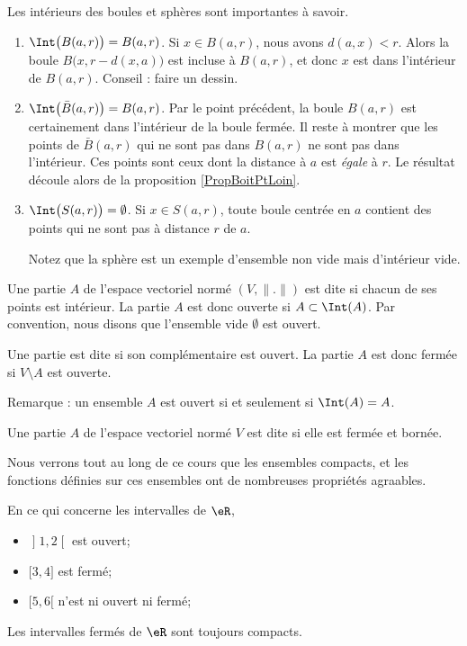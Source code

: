 \begin{example}			\label{ExempleIntBoules}
	Les intérieurs des boules et sphères sont importantes à savoir.
	\begin{enumerate}
		\item 
			$\Int\big( B(a,r) \big)=B(a,r)$. Si $x\in B(a,r)$, nous avons $d(a,x)<r$. Alors la boule $B\big(x,r-d(x,a)\big)$ est incluse à $B(a,r)$, et donc $x$ est dans l'intérieur de $B(a,r)$. Conseil : faire un dessin.
		\item
			$\Int\big( \bar B(a,r) \big)=B(a,r)$. Par le point précédent, la boule $B(a,r)$ est certainement dans l'intérieur de la boule fermée. Il reste à montrer que les points de $\bar B(a,r)$ qui ne sont pas dans $B(a,r)$ ne sont pas dans l'intérieur. Ces points sont ceux dont la distance à $a$ est \emph{égale} à $r$. Le résultat découle alors de la proposition \ref{PropBoitPtLoin}.
			
		\item
			$\Int\big( S(a,r) \big)=\emptyset$. Si $x\in S(a,r)$, toute boule centrée en $a$ contient des points qui ne sont pas à distance $r$ de $a$.
			
			Notez que la sphère est un exemple d'ensemble non vide mais d'intérieur vide.
	\end{enumerate}
\end{example}


\begin{definition}
	Une partie $A$ de l'espace vectoriel normé $(V,\| . \|)$ est dite  si chacun de ses points est intérieur. La partie $A$ est donc ouverte si $A\subset\Int(A)$. Par convention, nous disons que l'ensemble vide $\emptyset$ est ouvert.

	Une partie est dite  si son complémentaire est ouvert. La partie $A$ est donc fermée si $V\setminus A$ est ouverte.
\end{definition}

Remarque : un ensemble $A$ est ouvert si et seulement si $\Int(A)=A$.

\begin{definition}
	Une partie $A$ de l'espace vectoriel normé $V$ est dite  si elle est fermée et bornée.
\end{definition}

Nous verrons tout au long de ce cours que les ensembles compacts, et les fonctions définies sur ces ensembles ont de nombreuses propriétés agraables.

\begin{example}		\label{ExempleFermeIntevrR}
	En ce qui concerne les intervalles de $\eR$,
	\begin{itemize}
		\item $\mathopen] 1 , 2 \mathclose[$ est ouvert;
		\item $\mathopen[ 3,  4 \mathclose]$ est fermé;
		\item $\mathopen[ 5 , 6 [$ n'est ni ouvert ni fermé;
	\end{itemize}
	Les intervalles fermés de $\eR$ sont toujours compacts.
\end{example}

